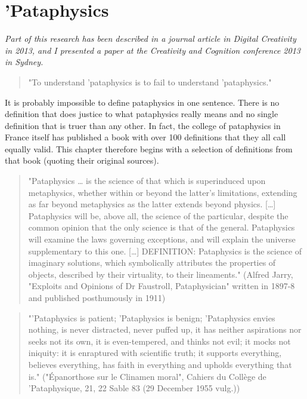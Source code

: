 
\chapter[Pataphysics]{'Pataphysics}
\label{ch:pataphysics}

\emph{Part of this research has been described in a journal article in Digital Creativity in 2013, and I presented a paper at the Creativity and Cognition conference 2013 in Sydney.}

\grule

\begin{quote}
  "To understand 'pataphysics is to fail to understand 'pataphysics." \citep{Hugill2012a}
\end{quote}

It is probably impossible to define pataphysics in one sentence. There is no definition that does justice to what pataphysics really means and no single definition that is truer than any other. In fact, the college of pataphysics in France itself has published a book \citep{Brotchie2003} with over 100 definitions that they all call equally valid. This chapter therefore begins with a selection of definitions from that book (quoting their original sources).

\begin{quote}
  "Pataphysics … is the science of that which is superinduced upon metaphysics, whether within or beyond the latter's limitations, extending as far beyond metaphysics as the latter extends beyond physics. […] Pataphysics will be, above all, the science of the particular, despite the common opinion that the only science is that of the general. Pataphysics will examine the laws governing exceptions, and will explain the universe supplementary to this one. […] DEFINITION: Pataphysics is the science of imaginary solutions, which symbolically attributes the properties of objects, described by their virtuality, to their lineaments." (Alfred Jarry, "Exploits and Opinions of Dr Faustroll, Pataphysician" written in 1897-8 and published posthumously in 1911) \citep{Jarry1996}
\end{quote}

\begin{quote}
  "'Pataphysics is patient; 'Pataphysics is benign; 'Pataphysics envies nothing, is never distracted, never puffed up, it has neither aspirations nor seeks not its own, it is even-tempered, and thinks not evil; it mocks not iniquity: it is enraptured with scientific truth; it supports everything, believes everything, has faith in everything and upholds everything that is." ("Épanorthose sur le Clinamen moral", Cahiers du Collège de 'Pataphysique, 21, 22 Sable 83 (29 December 1955 vulg.)) \citep{Brotchie2003}
\end{quote}

